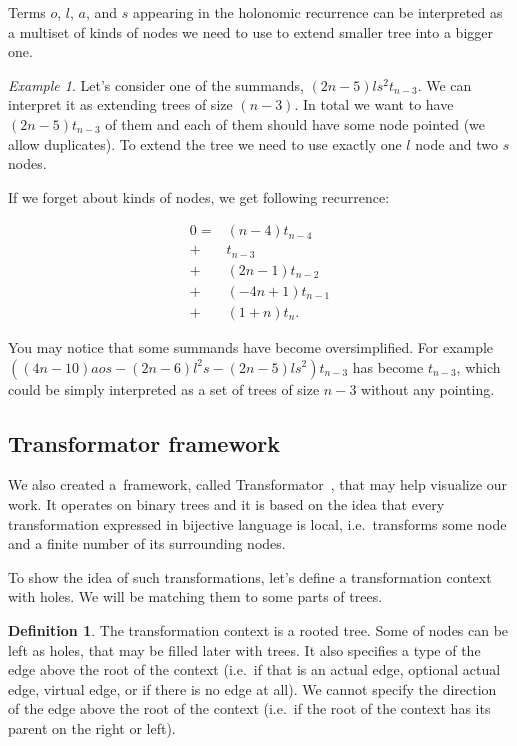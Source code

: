 \documentclass[final]{article}
\theoremstyle{definition}
\newtheorem{definition}{Definition}[subsection]
\theoremstyle{definition}
\theoremstyle{remark}
\newtheorem{example}{Example}[subsection]
\begin{document}
Terms \(o\), \(l\), \(a\), and \(s\) appearing in the holonomic recurrence can be interpreted as a multiset of kinds of nodes we need to use to extend smaller tree into a bigger one.

\begin{example}
    Let's consider one of the summands, \((2n - 5) l s^2 t_{n - 3}\). We can interpret it as extending trees of size \((n - 3)\). In total we want to have \((2n - 5) t_{n - 3}\) of them and each of them should have some node pointed (we allow duplicates). To extend the tree we need to use exactly one \(l\) node and two \(s\) nodes.
\end{example}

If we forget about kinds of nodes, we get following recurrence:

\[\begin{array}{rl}
        0 =& (n - 4) t_{n - 4}\\
        +& t_{n - 3}\\
        +& (2 n - 1) t_{n - 2}\\
        +& (-4 n + 1) t_{n - 1}\\
        +& (1 + n) t_{n}.
\end{array}\]

You may notice that some summands have become oversimplified. For example \(((4 n - 10) a o s - (2 n - 6) l^2 s - (2 n - 5) l s^2) t_{n - 3}\) has become \(t_{n-3}\), which could be simply interpreted as a set of trees of size \(n - 3\) without any pointing.

\subsection{Transformator framework}%
\label{sub:the_framework}

We also created a~framework, called Transformator~\cite{transformator}, that may help visualize our work. It operates on binary trees and it is based on the idea that every transformation expressed in bijective language is local, i.e.~transforms some node and a finite number of its surrounding nodes.

To show the idea of such transformations, let's define a transformation context with holes. We will be matching them to some parts of trees.

\begin{definition}
    The transformation context is a rooted tree. Some of nodes can be left as holes, that may be filled later with trees. It also specifies a type of the edge above the root of the context (i.e.~if that is an actual edge, optional actual edge, virtual edge, or if there is no edge at all). We cannot specify the direction of the edge above the root of the context (i.e.~if the root of the context has its parent on the right or left).
\end{definition}
\end{document}
